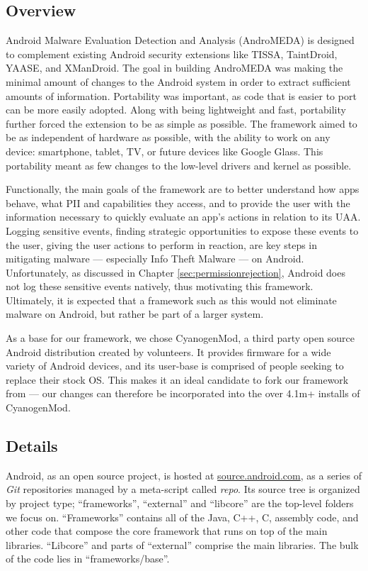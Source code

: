 \documentclass{acm_proc_article-sp}
\begin{document}
\subsection{Overview}
Android Malware Evaluation Detection and Analysis (AndroMEDA) is designed to complement existing Android security extensions like TISSA\citep{zhou2011taming}, TaintDroid\citep{enck2010taintdroid}, YAASE\citep{russello2011yaase}, and XManDroid\citep{bugiel2011xmandroid}. The goal in building AndroMEDA was making the minimal amount of changes to the Android system in order to extract sufficient amounts of information. Portability was important, as code that is easier to port can be more easily adopted. Along with being lightweight and fast, portability further forced the extension to be as simple as possible. The framework aimed to be as independent of hardware as possible, with the ability to work on any device: smartphone, tablet, TV, or future devices like Google Glass. This portability meant as few changes to the low-level drivers and kernel as possible.

Functionally, the main goals of the framework are to better understand how apps behave, what PII and capabilities they access, and to provide the user with the information necessary to quickly evaluate an app's actions in relation to its UAA. Logging sensitive events, finding strategic opportunities to expose these events to the user, giving the user actions to perform in reaction, are key steps in mitigating malware --- especially Info Theft Malware --- on Android. Unfortunately, as discussed in Chapter \ref{sec:permissionrejection}, Android does not log these sensitive events natively, thus motivating this framework. Ultimately, it is expected that a framework such as this would not eliminate malware on Android, but rather be part of a larger system.

As a base for our framework, we chose CyanogenMod\citep{cyanogenmod}, a third party open source Android distribution created by volunteers. It provides firmware for a wide variety of Android devices, and its user-base is comprised of people seeking to replace their stock OS. This makes it an ideal candidate to fork our framework from --- our changes can therefore be incorporated into the over 4.1m+ installs of CyanogenMod\citep{cyanogenmodstats}.

\subsection{Details}
Android, as an open source project, is hosted at \url{source.android.com}\citep{androidsource}, as a series of \textit{Git} repositories managed by a meta-script called \textit{repo}. Its source tree is organized by project type; ``frameworks'', ``external'' and ``libcore'' are the top-level folders we focus on. ``Frameworks'' contains all of the Java, C++, C, assembly code, and other code that compose the core framework that runs on top of the main libraries. ``Libcore'' and parts of ``external'' comprise the main libraries. The bulk of the code lies in ``frameworks/base''.
\end{document}
